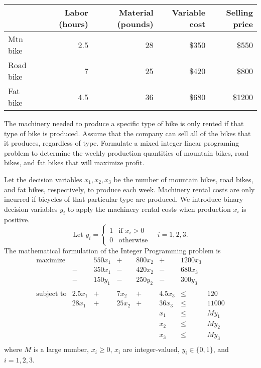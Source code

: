 \begin{enumerate}
\vspace{.1in}
\begin{tabulary}{5.4in}{LRRRR}
& Labor (hours) 
& Material (pounds) 
& Variable cost 
& Selling price \\ \hline
Mtn bike & 2.5 & 28 & \$350 & \$550 \\
Road bike & 7 & 25 & \$420 & \$800 \\
Fat bike & 4.5 & 36 & \$680 & \$\num{1200}
\end{tabulary}
\vspace{.1in}

The machinery needed to produce a specific type of bike is only rented
if that type of bike is produced. Assume that the company can sell all
of the bikes that it produces, regardless of type.  Formulate a mixed
integer linear programing problem to determine the weekly production
quantities of mountain bikes, road bikes, and fat bikes that will
maximize profit.

\begin{solution}
  \bs Let the decision variables $x_1,x_2,x_3$ be the number of
  mountain bikes, road bikes, and fat bikes, respectively, to produce
  each week. Machinery rental costs are only incurred if bicycles of that
  particular type are produced. We introduce binary decision variables
  $y_i$ to apply the machinery rental costs when production $x_i$ is
  positive.
\[
\text{Let $y_i$} = 
\begin{cases}
1 & \text{if $x_i > 0$} \\
0 & \text{otherwise}
\end{cases}
\quad i = 1,2,3.
\]
The mathematical formulation of the Integer Programming problem is
\[
\begin{array}{lrrrrrrl}
\textrm{maximize} &   & 550x_1 & + & 800x_2 & + & \num{1200}x_3 & \\
& - & 350x_1  & - & 420x_2 & - & 680x_3  & \\
& - & 150y_1& - & 250y_2&- & 300y_3& \\
& & & & & & &\\
\textrm{subject to} & 2.5x_1 & + & 7x_2 & + & 4.5x_3 & \leq & 120 \\
& 28x_1 & + & 25x_2 & + & 36x_3 & \leq & \num{11000} \\
& & & & & x_1 & \leq & My_1 \\
& & & & & x_2 & \leq & My_2 \\
& & & & & x_3 & \leq & My_3 \\
\end{array}
\]
where $M$ is a large number, $x_i \geq 0$, $x_i$ are integer-valued, 
$y_i \in \{0,1\}$, and $i = 1,2,3$.
\end{solution}


\end{enumerate}
